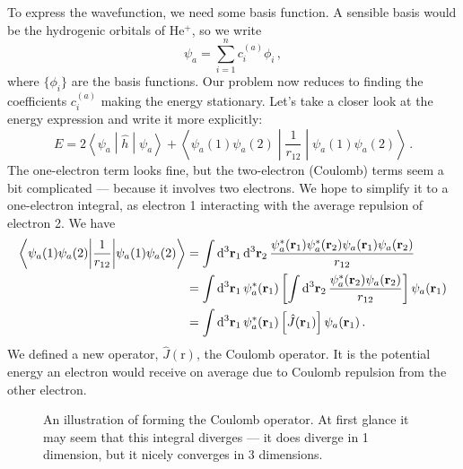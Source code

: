 \documentclass{article}
\theoremstyle{plain}\theoremheaderfont{\normalfont\itshape}\theorembodyfont{\rmfamily}\theoremseparator{.}\newtheorem*{rem}{Remark}\newtheorem*{ex}{Example}\newtheorem*{proof}{Proof}\newtheorem*{altp}{Alternative proof}
\theoremstyle{plain}\theoremheaderfont{\normalfont\bfseries}\theorembodyfont{\rmfamily}\theoremseparator{.}\newtheorem{thm}{Theorem}[section]\newtheorem{lem}[thm]{Lemma}\newtheorem{prop}[thm]{Proposition}\newtheorem*{cor}{Corollary}\newtheorem{defn}[thm]{Definition}\newtheorem{clm}[thm]{Claim}\newtheorem{clminproof}{Claim}\newtheorem{pos}{Postulate}[section]
\theoremstyle{break}\theoremheaderfont{\normalfont\itshape}\theorembodyfont{\rmfamily}\theoremseparator{.\medskip}\newtheorem*{proofskip}{Proof}\newtheorem*{exs}{Examples}\newtheorem*{rems}{Remarks}
\theoremstyle{break}\theoremheaderfont{\normalfont\bfseries}\theorembodyfont{\rmfamily}\theoremseparator{.\medskip}\newtheorem{lemskip}[thm]{Lemma}\newtheorem{defnskip}[thm]{Definition}\newtheorem{propskip}[thm]{Proposition}\newtheorem{thmskip}[thm]{Theorem}
\numberwithin{equation}{section}
\newcommand{\dd}[2][]{\mathrm{d}^{#1} #2\,}
\newcommand{\mel}[3]{\left\langle #1 \middle| #2 \middle| #3 \right\rangle}
\newcommand{\vb}[1]{\bm{\mathrm{#1}}}
\newcommand{\abs}[1]{\left| #1 \right|}
\begin{document}
    To express the wavefunction, we need some basis function. A sensible basis would be the hydrogenic orbitals of \(\mathrm{He^+}\), so we write
    \begin{equation}
        \psi_a=\sum_{i=1}^{n}c_i^{(a)}\phi_i\,,
    \end{equation}
    where \(\{\phi_i\}\) are the basis functions. Our problem now reduces to finding the coefficients \(c_i^{(a)}\) making the energy stationary. Let's take a closer look at the energy expression and write it more explicitly:
    \begin{equation}
        E=2\mel{\psi_a}{\hat{h}}{\psi_a}+\mel{\psi_a(1)\psi_a(2)}{\frac{1}{r_{12}}}{\psi_a(1)\psi_a(2)}\,.
    \end{equation}
    The one-electron term looks fine, but the two-electron (Coulomb) terms seem a bit complicated --- because it involves two electrons. We hope to simplify it to a one-electron integral, as electron 1 interacting with the average repulsion of electron 2. We have
    \begin{align}
        \mel{\psi_a(1)\psi_a(2)}{\frac{1}{r_{12}}}{\psi_a(1)\psi_a(2)}&=\int\dd[3]{\vb{r}_1}\dd[3]{\vb{r}_2}\frac{\psi_a^*(\vb{r}_1)\psi_a^*(\vb{r}_2)\psi_a(\vb{r}_1)\psi_a(\vb{r}_2)}{r_{12}}\notag\\
        &=\int\dd[3]{\vb{r}_1}\psi_a^*(\vb{r}_1)\left[\int\dd[3]{\vb{r}_2}\frac{\psi_a^*(\vb{r}_2)\psi_a(\vb{r}_2)}{r_{12}}\right]\psi_a(\vb{r}_1)\notag\\
        &=\int\dd[3]{\vb{r}_1}\psi_a^*(\vb{r}_1)\left[\hat{J}(\vb{r}_1)\right]\psi_a(\vb{r}_1)\,.
    \end{align}
    We defined a new operator, \(\hat{J}(\vb{r})\), the Coulomb operator. It is the potential energy an electron would receive on average due to Coulomb repulsion from the other electron.
    \begin{figure}
        \centering
        \caption{An illustration of forming the Coulomb operator. At first glance it may seem that this integral diverges --- it does diverge in 1 dimension, but it nicely converges in 3 dimensions.}
    \end{figure}
\end{document}
